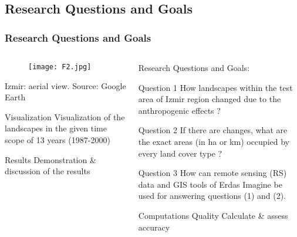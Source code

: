 \documentclass[pdflatex,compress,8pt,
	xcolor={dvipsnames,dvipsnames,svgnames,x11names,table},
	hyperref={colorlinks = true,
	breaklinks = true, 
	urlcolor = NavyBlue, 
	breaklinks = true}]{beamer}
\begin{document}
\subsection{Research Questions and Goals}
\begin{frame}\frametitle{Research Questions and Goals}
\begin{minipage}[0.4\textheight]{\textwidth}
\begin{columns}[T]
\begin{column}{0.5\textwidth}
\vspace{2em}
\begin{figure}[H]
	\centering
		\texttt{[image: F2.jpg]}
\end{figure}
\footnotesize{Izmir: aerial view. Source: Google Earth}
\normalsize
\begin{block}{Visualization}
Visualization of the landscapes in the given time scope of 13 years (1987-2000)
\end{block}

\begin{block}{Results}
Demonstration \& discussion of the results
\end{block}

\end{column}
\begin{column}{0.5\textwidth}
\vspace{1em} 
Research Questions and Goals: 

\begin{alertblock}{Question 1}
How landscapes within the test area of Izmir region changed due to the anthropogenic effects ?
\end{alertblock}

\begin{alertblock}{Question 2}
If there are changes, what are the exact areas (in ha or km) occupied by every land cover type ?
\end{alertblock}

\begin{alertblock}{Question 3}
How can remote sensing (RS) data and GIS tools of Erdas Imagine be used for answering questions (1) and (2). 
\end{alertblock}

\begin{alertblock}{Computations Quality}
Calculate \& assess accuracy
\end{alertblock}

\end{column}
\end{columns}
\end{minipage}
\end{frame}
\end{document}
